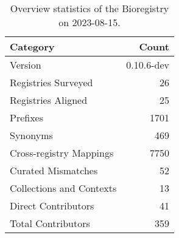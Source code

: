 \begin{table}
\caption{Overview statistics of the Bioregistry on 2023-08-15.}
\label{tab:bioregistry-summary}
\begin{tabular}{lr}
\toprule
Category & Count \\
\midrule
Version & 0.10.6-dev \\
Registries Surveyed & 26 \\
Registries Aligned & 25 \\
Prefixes & 1701 \\
Synonyms & 469 \\
Cross-registry Mappings & 7750 \\
Curated Mismatches & 52 \\
Collections and Contexts & 13 \\
Direct Contributors & 41 \\
Total Contributors & 359 \\
\bottomrule
\end{tabular}
\end{table}
